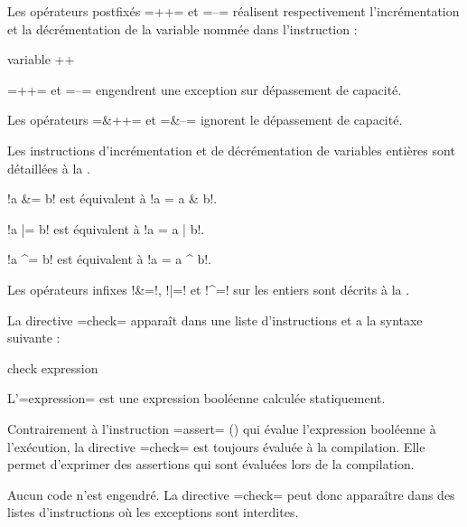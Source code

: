 
Les opérateurs postfixés \plm=++= et \plm=--= réalisent respectivement l'incrémentation et la décrémentation de la variable nommée dans l'instruction :
\begin{PLM}
variable ++
\end{PLM}

\plm=++= et \plm=--= engendrent une exception sur dépassement de capacité.

Les opérateurs \plm=&++= et \plm=&--= ignorent le dépassement de capacité.

Les instructions d'incrémentation et de décrémentation de variables entières sont détaillées à la .






\index{\&=}
\index{\textbar=}
\index{\^{}=}

\plm!a &= b! est équivalent à \plm!a = a & b!.

\plm!a |= b! est équivalent à \plm!a = a | b!.

\plm!a ^= b! est équivalent à \plm!a = a ^ b!.

Les opérateurs infixes \plm!&=!, \plm!|=! et \plm!^=! sur les entiers sont décrits à la .



La directive \plm=check= apparaît dans une liste d'instructions et a la syntaxe suivante :
\begin{PLM}
check expression
\end{PLM}

L'\plm=expression= est une expression booléenne calculée statiquement.

Contrairement à l'instruction \plm=assert= () qui évalue l'expression booléenne à l'exécution, la directive \plm=check= est toujours évaluée à la compilation. Elle permet d'exprimer des assertions qui sont évaluées lors de la compilation.

Aucun code n'est engendré. La directive \plm=check= peut donc apparaître dans des listes d'instructions où les exceptions sont interdites.

